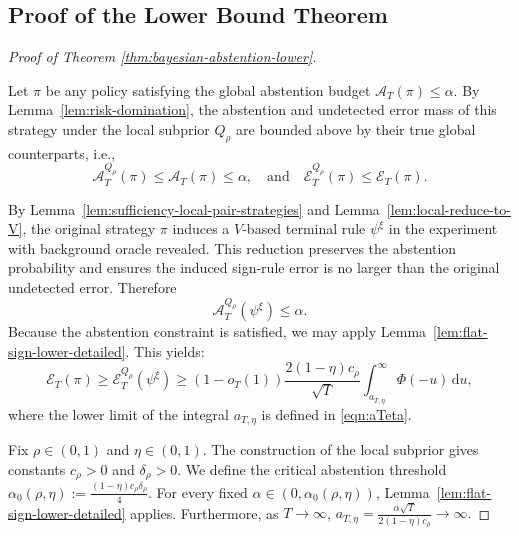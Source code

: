 \documentclass[10pt]{article}
\newcommand{\dd}{\mathrm{d}}
\theoremstyle{plain}
\begin{document}
\subsection{Proof of the  Lower Bound Theorem}
\begin{proof}[Proof of Theorem \ref{thm:bayesian-abstention-lower}]
\label{subsec:lower-bound-conclusion}

Let $\pi$ be any policy satisfying the global abstention budget $\mathcal{A}_T(\pi) \le \alpha$. By Lemma~\ref{lem:risk-domination}, the abstention and undetected error mass of this strategy under the local subprior $Q_\rho$ are  bounded  above by their true global counterparts, i.e., 
$$ \mathcal{A}_T^{Q_\rho}(\pi) \le \mathcal{A}_T(\pi) \le \alpha, \quad \mbox{and} \quad
\mathcal{E}_T^{Q_\rho}(\pi)\le \mathcal{E}_T(\pi).$$


By Lemma~\ref{lem:sufficiency-local-pair-strategies} and Lemma~\ref{lem:local-reduce-to-V}, the original strategy $\pi$ induces a $V$-based terminal rule   $\psi^\xi$ in the experiment with background oracle revealed. This reduction preserves the abstention probability and ensures the induced sign-rule error is no larger than the original undetected error. Therefore
$$ \mathcal{A}_T^{Q_\rho}(\psi^\xi) \le \alpha. $$
Because the abstention constraint is satisfied, we may apply Lemma~\ref{lem:flat-sign-lower-detailed}. This yields:
$$ \mathcal{E}_T(\pi) \ge \mathcal{E}_T^{Q_\rho}(\psi^\xi) \ge (1-o_T(1)) \frac{2(1-\eta)c_\rho}{\sqrt{T}} \int_{a_{T,\eta}}^\infty \Phi(-u)\,\dd u, $$
where the lower limit of the integral $a_{T,\eta}$ is defined in \eqref{eqn:aTeta}.

Fix $\rho \in (0,1)$ and $\eta \in (0,1)$. The construction of the local subprior gives constants $c_\rho > 0$ and $\delta_{\rho} > 0$. We define the critical abstention threshold
$ \alpha_0(\rho,\eta) := \frac{(1-\eta)c_\rho\delta_{\rho}}{4}. $
For every fixed $\alpha \in (0, \alpha_0(\rho,\eta))$, Lemma~\ref{lem:flat-sign-lower-detailed} applies. Furthermore, as $T \to \infty$, $  a_{T,\eta} = \frac{\alpha\sqrt{T}}{2(1-\eta)c_\rho} \to \infty. $


\end{proof}
\end{document}
